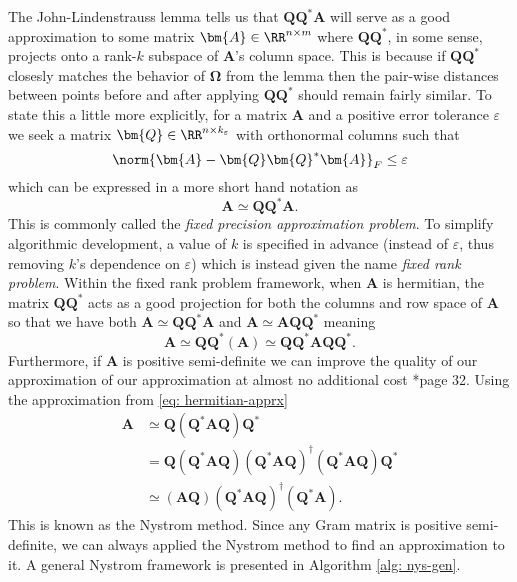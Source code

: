 The John-Lindenstrauss lemma tells us that $\bm{Q} \bm{Q}^{\ast} \bm{A}$ will serve as a good approximation to some matrix $\bm{A} \in \RR^{n \times m}$ where $\bm{Q} \bm{Q}^{\ast}$, in some sense, projects onto a rank-$k$ subspace of $\bm{A}$'s column space. This is because if $\bm{Q} \bm{Q}^{\ast}$ closesly matches the behavior of $\bm{\Omega}$ from the lemma then the pair-wise distances between points before and after applying $\bm{Q} \bm{Q}^{\ast}$ should remain fairly similar. To state this a little more explicitly, for a matrix $\bm{A}$ and a positive error tolerance $\varepsilon$ we seek a matrix $\bm{Q} \in \RR^{n \times k_{\varepsilon}}$ with orthonormal columns such that
\begin{equation*}
    \norm{\bm{A} - \bm{Q} \bm{Q}^{\ast} \bm{A}}_{F} \leq \varepsilon
\end{equation*}
which can be expressed in a more short hand notation as
\begin{equation} \label{eq: nys-Q-cond}
    \bm{A} \simeq \bm{Q} \bm{Q}^{\ast} \bm{A}.
\end{equation}
This is commonly called the {\it fixed precision approximation problem}. To simplify algorithmic development, a value of $k$ is specified in advance (instead of $\varepsilon$, thus removing $k$'s dependence on $\varepsilon$) which is instead given the name {\it fixed rank problem}. Within the fixed rank problem framework, when $\bm{A}$ is hermitian, the matrix $\bm{Q} \bm{Q}^{\ast}$ acts as a good projection for both the columns and row space of $\bm{A}$ so that we have both $\bm{A} \simeq \bm{Q} \bm{Q}^{\ast} \bm{A}$ and $\bm{A} \simeq \bm{A} \bm{Q} \bm{Q}^{\ast}$ meaning
\begin{equation} \label{eq: hermitian-apprx}
    \bm{A} \simeq \bm{Q} \bm{Q}^{\ast} \left( \bm{A} \right) \simeq \bm{Q} \bm{Q}^{\ast} \bm{A} \bm{Q} \bm{Q}^{\ast}.
\end{equation}
Furthermore, if $\bm{A}$ is positive semi-definite we can improve the quality of our approximation of our approximation at almost no additional cost \cite{halko2011finding}*{page 32}. Using the approximation from \ref{eq: hermitian-apprx}
\begin{align} \label{eq: nys-apprx}
    \bm{A} & \simeq \bm{Q} \left( \bm{Q}^{\ast} \bm{A} \bm{Q} \right) \bm{Q}^{\ast} \nonumber                                                                                            \\
           & = \bm{Q} \left( \bm{Q}^{\ast} \bm{A} \bm{Q} \right) \left( \bm{Q}^{\ast} \bm{A} \bm{Q} \right)^{\dagger} \left( \bm{Q}^{\ast} \bm{A} \bm{Q} \right) \bm{Q}^{\ast} \nonumber \\
           & \simeq \left( \bm{A} \bm{Q} \right) \left( \bm{Q}^{\ast} \bm{A} \bm{Q} \right)^{\dagger} \left( \bm{Q}^{\ast} \bm{A} \right).
\end{align}
This is known as the Nystrom method. Since any Gram matrix is positive semi-definite, we can always applied the Nystrom method to find an approximation to it. A general Nystrom framework is presented in Algorithm \ref{alg: nys-gen}.

